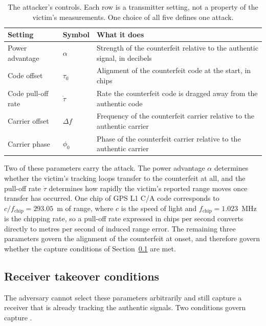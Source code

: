 \begin{table}[t]
\centering
\caption{The attacker's controls. Each row is a transmitter setting, not a property of
the victim's measurements. One choice of all five defines one attack.}
\label{tab:attacker}
\begin{tabular}{@{}llp{8.5cm}@{}}
\toprule
Setting & Symbol & What it does \\
\midrule
Power advantage      & $\alpha$   & Strength of the counterfeit relative to the
                                    authentic signal, in decibels \\
Code offset          & $\tau_0$   & Alignment of the counterfeit code at the start,
                                    in chips \\
Code pull-off rate   & $\dot\tau$ & Rate the counterfeit code is dragged away from the
                                    authentic code \\
Carrier offset       & $\Delta f$ & Frequency of the counterfeit carrier relative to
                                    the authentic carrier \\
Carrier phase        & $\phi_0$   & Phase of the counterfeit carrier relative to the
                                    authentic carrier \\
\bottomrule
\end{tabular}
\end{table}

Two of these parameters carry the attack. The power advantage $\alpha$ determines whether
the victim's tracking loops transfer to the counterfeit at all, and the pull-off rate
$\dot\tau$ determines how rapidly the victim's reported range moves once transfer has
occurred. One chip of GPS L1 C/A code corresponds to
$c/f_\mathrm{chip} = 293.05$~m of range, where $c$ is the speed of light and
$f_\mathrm{chip} = 1.023$~MHz is the chipping rate, so a pull-off rate expressed in chips
per second converts directly to metres per second of induced range error. The remaining
three parameters govern the alignment of the counterfeit at onset, and therefore govern
whether the capture conditions of Section~\ref{sec:takeover} are met.

\subsection{Receiver takeover conditions}
\label{sec:takeover}

The adversary cannot select these parameters arbitrarily and still capture a receiver that
is already tracking the authentic signals. Two conditions govern capture
\citep{psiaki2016gnss,kerns2014uav}.

